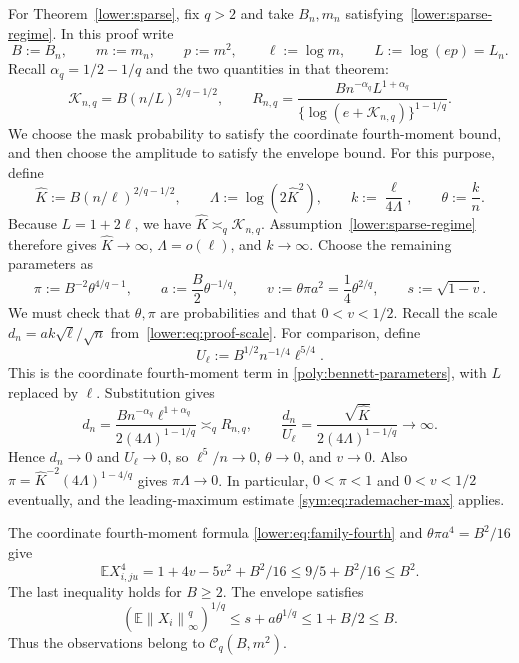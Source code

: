 \documentclass[11pt,letterpaper]{article}
\theoremstyle{remark}
\newcommand{\E}{\mathbb E}
\newcommand{\norm}[1]{\left\lVert#1\right\rVert}
\begin{document}
For Theorem~\ref{lower:sparse}, fix \(q>2\) and take \(B_n,m_n\)
satisfying~\eqref{lower:sparse-regime}. In this proof write
\[
 B:=B_n,\qquad m:=m_n,\qquad p:=m^2,\qquad
 \ell:=\log m,\qquad L:=\log(ep)=L_n.
\]
Recall \(\alpha_q=1/2-1/q\) and the two quantities in that theorem:
\[
 \mathcal K_{n,q}=B(n/L)^{2/q-1/2},\qquad
 R_{n,q}=\frac{B n^{-\alpha_q}L^{1+\alpha_q}}
                   {\{\log(e+\mathcal K_{n,q})\}^{1-1/q}}.
\]
We choose the mask probability to satisfy the coordinate
fourth-moment bound, and then choose the amplitude to satisfy the
envelope bound. For this purpose, define
\[
 \widehat K:=B(n/\ell)^{2/q-1/2},\qquad
 \Lambda:=\log(2\widehat K^2),\qquad
 k:=\frac{\ell}{4\Lambda},\qquad \theta:=\frac{k}{n}.
\]
Because \(L=1+2\ell\), we have
\(\widehat K\asymp_q\mathcal K_{n,q}\).
Assumption~\eqref{lower:sparse-regime}
therefore gives \(\widehat K\to\infty\), \(\Lambda=o(\ell)\),
and \(k\to\infty\). Choose the remaining parameters as
\begin{equation}
 \pi:=B^{-2}\theta^{4/q-1},\qquad a:=\frac B2\theta^{-1/q},
 \qquad v:=\theta\pi a^2=\frac14\theta^{2/q},\qquad s:=\sqrt{1-v}.
 \label{q4:eq:sparse-parameters}
\end{equation}
We must check that \(\theta,\pi\) are probabilities and that
\(0<v<1/2\). Recall the scale
\(d_n=ak\sqrt\ell/\sqrt n\) from~\eqref{lower:eq:proof-scale}.
For comparison, define
\[
 U_\ell:=B^{1/2}n^{-1/4}\ell^{5/4}.
\]
This is the coordinate fourth-moment term in
\eqref{poly:bennett-parameters}, with \(L\) replaced by \(\ell\).
Substitution gives
\[
 d_n=\frac{B n^{-\alpha_q}\ell^{1+\alpha_q}}
          {2(4\Lambda)^{1-1/q}}\asymp_q R_{n,q},\qquad
 \frac{d_n}{U_\ell}
 =\frac{\sqrt{\widehat K}}{2(4\Lambda)^{1-1/q}}\longrightarrow\infty.
\]
Hence \(d_n\to0\) and \(U_\ell\to0\), so \(\ell^5/n\to0\),
\(\theta\to0\), and \(v\to0\). Also
\(\pi=\widehat K^{-2}(4\Lambda)^{1-4/q}\) gives
\(\pi\Lambda\to0\). In particular, \(0<\pi<1\) and
\(0<v<1/2\) eventually, and the leading-maximum estimate
\eqref{sym:eq:rademacher-max} applies.

The coordinate fourth-moment formula
\eqref{lower:eq:family-fourth} and
\(\theta\pi a^4=B^2/16\) give
\begin{equation}
 \E X_{i,ju}^4
 =1+4v-5v^2+B^2/16\le9/5+B^2/16\le B^2.
 \label{q4:eq:sparse-coordinate-moments}
\end{equation}
The last inequality holds for \(B\ge2\). The envelope satisfies
\begin{equation}
 (\E\norm{X_i}_\infty^q)^{1/q}
 \le s+a\theta^{1/q}\le1+B/2\le B.
 \label{q4:eq:sparse-envelope-moment}
\end{equation}
Thus the observations belong to \(\mathcal C_q(B,m^2)\).
\end{document}
